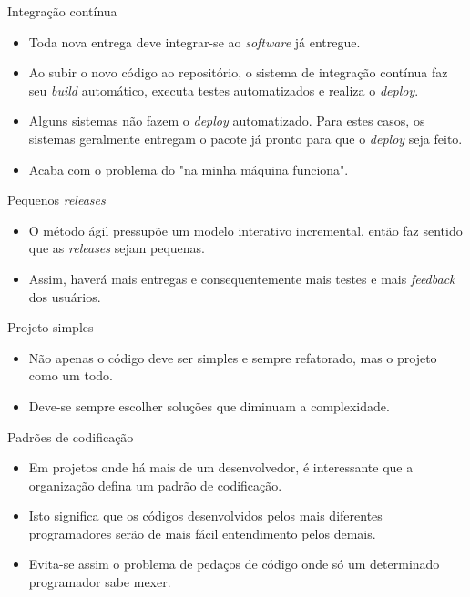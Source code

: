 \documentclass[11pt]{beamer}
\begin{document}
    \begin{frame}{Integração contínua}
      \begin{itemize}
         \item Toda nova entrega deve integrar-se ao \textit{software} já entregue.
         \item Ao subir o novo código ao repositório, o sistema de integração contínua faz seu \textit{build} automático, executa testes automatizados e realiza o \textit{deploy}.
         \item Alguns sistemas não fazem o \textit{deploy} automatizado. Para estes casos, os sistemas geralmente entregam o pacote já pronto para que o \textit{deploy} seja feito.
         \item Acaba com o problema do "na minha máquina funciona".
      \end{itemize}
    \end{frame}

    \begin{frame}{Pequenos \textit{releases}}
      \begin{itemize}
         \item O método ágil pressupõe um modelo interativo incremental, então faz sentido que as \textit{releases} sejam pequenas.
         \item Assim, haverá mais entregas e consequentemente mais testes e mais \textit{feedback} dos usuários. 
      \end{itemize}
    \end{frame}    

    \begin{frame}{Projeto simples}
      \begin{itemize}
         \item Não apenas o código deve ser simples e sempre refatorado, mas o projeto como um todo.
         \item Deve-se sempre escolher soluções que diminuam a complexidade.
      \end{itemize}
    \end{frame}

    \begin{frame}{Padrões de codificação}
      \begin{itemize}
         \item Em projetos onde há mais de um desenvolvedor, é interessante que a organização defina um padrão de codificação.
         \item Isto significa que os códigos desenvolvidos pelos mais diferentes programadores serão de mais fácil entendimento pelos demais.
         \item Evita-se assim o problema de pedaços de código onde só um determinado programador sabe mexer.
      \end{itemize}
    \end{frame}
\end{document}
